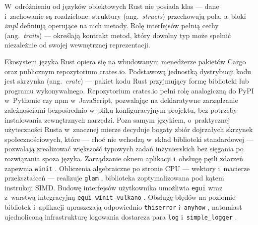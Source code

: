 W~odróżnieniu od języków obiektowych Rust nie posiada klas --- dane
i~zachowanie są rozdzielone: struktury (ang.~\textit{structs}) przechowują
pola, a~bloki \textit{impl} definiują operujące na nich metody.
Rolę interfejsów pełnią cechy (ang.~\textit{traits}) --- określają
kontrakt metod, który dowolny typ może spełnić niezależnie od swojej
wewnętrznej reprezentacji.

Ekosystem języka Rust opiera się na wbudowanym menedżerze pakietów 
Cargo oraz publicznym repozytorium crates.io. Podstawową jednostką dystrybucji
kodu jest skrzynka (ang.~\textit{crate}) --- pakiet kodu Rust przyjmujący 
formę biblioteki lub programu wykonywalnego. Repozytorium crates.io pełni rolę analogiczną 
do PyPI w~Pythonie czy npm w~JavaScript, pozwalając na deklaratywne zarządzanie zależnościami 
bezpośrednio w~pliku konfiguracyjnym projektu, bez potrzeby instalowania zewnętrznych narzędzi. 
Poza samym językiem, o~praktycznej użyteczności Rusta w~znacznej mierze decyduje bogaty zbiór dojrzałych
skrzynek społecznościowych, które --- choć nie wchodzą w~skład biblioteki standardowej --- pozwalają zrealizować
większość typowych zadań inżynierskich bez sięgania po rozwiązania spoza języka. Zarządzanie oknem aplikacji
i~obsługę pętli zdarzeń zapewnia \texttt{winit} \cite{winit}. Obliczenia algebraiczne po stronie CPU ---
wektory i~macierze przekształceń --- realizuje \texttt{glam} \cite{glam}, biblioteka zoptymalizowana pod kątem
instrukcji SIMD. Budowę interfejsów użytkownika umożliwia \texttt{egui} \cite{egui} wraz z~warstwą integracyjną
\texttt{egui\_winit\_vulkano} \cite{egui-winit-vulkano}.
Obsługę błędów na poziomie bibliotek i~aplikacji upraszczają odpowiednio \texttt{thiserror} \cite{thiserror} i~\texttt{anyhow} \cite{anyhow},
natomiast ujednoliconą infrastrukturę logowania dostarcza para \texttt{log} \cite{log-rs} i~\texttt{simple\_logger} \cite{simple-logger}.

